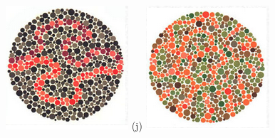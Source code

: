 \documentclass[	12pt, Times, openright, twoside, a4paper, english, brazil]{abntex2}
\begin{document}
\begin{apendicesenv}
\begin{figure}[!htb]
\centering
{\includegraphics[width=\linewidth]{ishihara-transformacao/figureIshihara27.png}}
(j)
\endminipage\hfill
{}
\centering
{\includegraphics[width=\linewidth]{ishihara-transformacao/figureIshihara28.png}}

\end{figure}
\end{apendicesenv}
\end{document}
